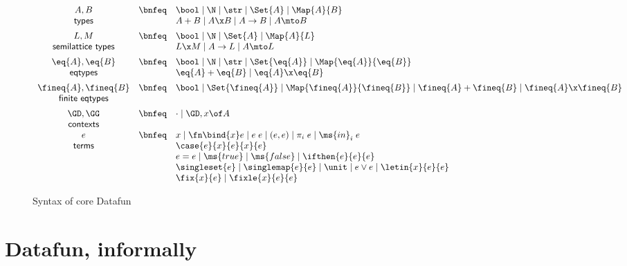 \begin{figure}
  \[\begin{array}{ccl}
    A, B     &\bnfeq& \bool \pipe \N \pipe \str \pipe \Set{A}
                      \pipe \Map{A}{B}
    \\
    \textsf{types} && A + B \pipe A \x B \pipe A \uto B \pipe A \mto B
    \vspace{0.5em}\\
    L, M         &\bnfeq& \bool \pipe \N \pipe \Set{A} \pipe \Map{A}{L}
    \\
    \textsf{semilattice types} && L \x M \pipe A \uto L \pipe A \mto L
    \vspace{0.5em}\\
    \eq{A}, \eq{B} &\bnfeq& \bool \pipe \N \pipe \str \pipe \Set{\eq{A}}
                            \pipe \Map{\eq{A}}{\eq{B}}
    \\
    \textsf{eqtypes} && \eq{A} + \eq{B} \pipe \eq{A} \x \eq{B}
    \vspace{0.5em}\\
    \fineq{A},\fineq{B}
    &\bnfeq& \bool \pipe \Set{\fineq{A}}
       \pipe \Map{\fineq{A}}{\fineq{B}}
       \pipe \fineq{A} + \fineq{B} \pipe \fineq{A} \x \fineq{B}\\
    \textsf{finite eqtypes}
    \vspace{0.5em}\\
    \GD,\GG &\bnfeq& \cdot \pipe \GD, x\of A\\
    \textsf{contexts}\\
    e &\bnfeq& x \pipe \fn\bind{x} e \pipe e\;e
    \pipe (e,e) \pipe \pi_i\;e \pipe \ms{in}_i\;e\\
    \textsf{terms}
    && \case{e}{x}{e}{x}{e}\\
    && e = e \pipe \ms{true} \pipe \ms{false} \pipe \ifthen{e}{e}{e}\\
    && \singleset{e} \pipe \singlemap{e}{e}
       \pipe \unit \pipe e \vee e \pipe \letin{x}{e}{e}\\
    && \fix{x}{e} \pipe \fixle{x}{e}{e}
  \end{array}\]
  \caption{Syntax of core Datafun}
  \label{fig:syntax}
\end{figure}

\section{Datafun, informally}

